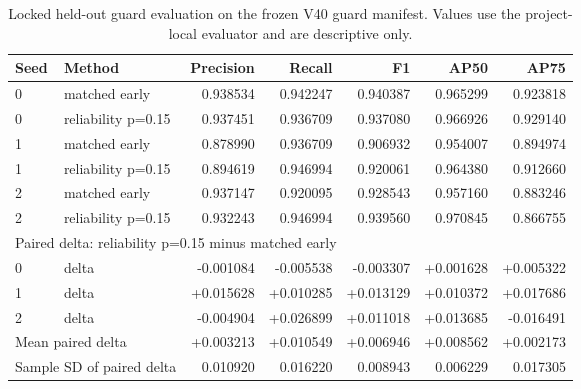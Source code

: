 \begin{table}[t]
\caption{Locked held-out guard evaluation on the frozen V40 guard manifest. Values use the project-local evaluator and are descriptive only.}
\label{tab:v42-heldout-guard}
\centering
\small
\begin{tabular}{llrrrrr}
\hline
Seed & Method & Precision & Recall & F1 & AP50 & AP75 \\
\hline
0 & matched early & 0.938534 & 0.942247 & 0.940387 & 0.965299 & 0.923818 \\
0 & reliability p=0.15 & 0.937451 & 0.936709 & 0.937080 & 0.966926 & 0.929140 \\
1 & matched early & 0.878990 & 0.936709 & 0.906932 & 0.954007 & 0.894974 \\
1 & reliability p=0.15 & 0.894619 & 0.946994 & 0.920061 & 0.964380 & 0.912660 \\
2 & matched early & 0.937147 & 0.920095 & 0.928543 & 0.957160 & 0.883246 \\
2 & reliability p=0.15 & 0.932243 & 0.946994 & 0.939560 & 0.970845 & 0.866755 \\
\hline
\multicolumn{7}{l}{Paired delta: reliability p=0.15 minus matched early} \\
0 & delta & -0.001084 & -0.005538 & -0.003307 & +0.001628 & +0.005322 \\
1 & delta & +0.015628 & +0.010285 & +0.013129 & +0.010372 & +0.017686 \\
2 & delta & -0.004904 & +0.026899 & +0.011018 & +0.013685 & -0.016491 \\
\hline
\multicolumn{2}{l}{Mean paired delta} & +0.003213 & +0.010549 & +0.006946 & +0.008562 & +0.002173 \\
\multicolumn{2}{l}{Sample SD of paired delta} & 0.010920 & 0.016220 & 0.008943 & 0.006229 & 0.017305 \\
\hline
\end{tabular}
\end{table}
